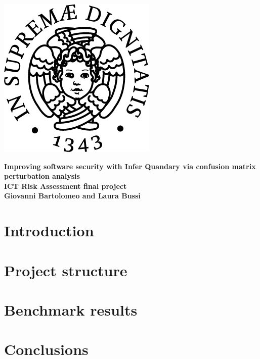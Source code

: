 \documentclass{article}
\begin{document}
\begin{titlepage}
\begin{center}
\includegraphics[scale=0.5]{unipi.png}
\end{center}

\begin{center}
	\vspace{5mm}
    {\LARGE{\bf Improving software security with Infer Quandary 
via confusion matrix perturbation analysis}}\\
    \vspace{5mm}
    {\large{\bf ICT Risk Assessment final project}}\\
    \vspace{2.5mm}
	{\large{\bf Giovanni Bartolomeo and Laura Bussi}}\\
\end{center}
\end{titlepage}

\section{Introduction}\label{sec:intro}



\section{Project structure}\label{sec:project}



\section{Benchmark results}\label{sec:results}



\section{Conclusions}\label{sec:conclusions}


\end{document}
